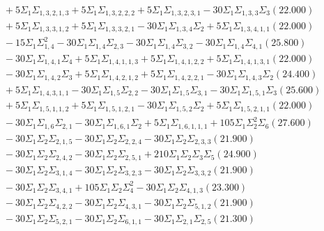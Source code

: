 \documentclass[12pt]{article}
\begin{document}
\begin{landscape}
\begin{align*}
		&\quad\quad +5\Sigma_{1}\Sigma_{1,3,2,1,3}+5\Sigma_{1}\Sigma_{1,3,2,2,2}+5\Sigma_{1}\Sigma_{1,3,2,3,1}-30\Sigma_{1}\Sigma_{1,3,3}\Sigma_{3}(22.000) \\ 
		&\quad\quad +5\Sigma_{1}\Sigma_{1,3,3,1,2}+5\Sigma_{1}\Sigma_{1,3,3,2,1}-30\Sigma_{1}\Sigma_{1,3,4}\Sigma_{2}+5\Sigma_{1}\Sigma_{1,3,4,1,1}(22.000) \\ 
		&\quad\quad -15\Sigma_{1}\Sigma_{1,4}^{2}-30\Sigma_{1}\Sigma_{1,4}\Sigma_{2,3}-30\Sigma_{1}\Sigma_{1,4}\Sigma_{3,2}-30\Sigma_{1}\Sigma_{1,4}\Sigma_{4,1}(25.800) \\ 
		&\quad\quad -30\Sigma_{1}\Sigma_{1,4,1}\Sigma_{4}+5\Sigma_{1}\Sigma_{1,4,1,1,3}+5\Sigma_{1}\Sigma_{1,4,1,2,2}+5\Sigma_{1}\Sigma_{1,4,1,3,1}(22.000) \\ 
		&\quad\quad -30\Sigma_{1}\Sigma_{1,4,2}\Sigma_{3}+5\Sigma_{1}\Sigma_{1,4,2,1,2}+5\Sigma_{1}\Sigma_{1,4,2,2,1}-30\Sigma_{1}\Sigma_{1,4,3}\Sigma_{2}(24.400) \\ 
		&\quad\quad +5\Sigma_{1}\Sigma_{1,4,3,1,1}-30\Sigma_{1}\Sigma_{1,5}\Sigma_{2,2}-30\Sigma_{1}\Sigma_{1,5}\Sigma_{3,1}-30\Sigma_{1}\Sigma_{1,5,1}\Sigma_{3}(25.600) \\ 
		&\quad\quad +5\Sigma_{1}\Sigma_{1,5,1,1,2}+5\Sigma_{1}\Sigma_{1,5,1,2,1}-30\Sigma_{1}\Sigma_{1,5,2}\Sigma_{2}+5\Sigma_{1}\Sigma_{1,5,2,1,1}(22.000) \\ 
		&\quad\quad -30\Sigma_{1}\Sigma_{1,6}\Sigma_{2,1}-30\Sigma_{1}\Sigma_{1,6,1}\Sigma_{2}+5\Sigma_{1}\Sigma_{1,6,1,1,1}+105\Sigma_{1}\Sigma_{2}^{2}\Sigma_{6}(27.600) \\ 
		&\quad\quad -30\Sigma_{1}\Sigma_{2}\Sigma_{2,1,5}-30\Sigma_{1}\Sigma_{2}\Sigma_{2,2,4}-30\Sigma_{1}\Sigma_{2}\Sigma_{2,3,3}(21.900) \\ 
		&\quad\quad -30\Sigma_{1}\Sigma_{2}\Sigma_{2,4,2}-30\Sigma_{1}\Sigma_{2}\Sigma_{2,5,1}+210\Sigma_{1}\Sigma_{2}\Sigma_{3}\Sigma_{5}(24.900) \\ 
		&\quad\quad -30\Sigma_{1}\Sigma_{2}\Sigma_{3,1,4}-30\Sigma_{1}\Sigma_{2}\Sigma_{3,2,3}-30\Sigma_{1}\Sigma_{2}\Sigma_{3,3,2}(21.900) \\ 
		&\quad\quad -30\Sigma_{1}\Sigma_{2}\Sigma_{3,4,1}+105\Sigma_{1}\Sigma_{2}\Sigma_{4}^{2}-30\Sigma_{1}\Sigma_{2}\Sigma_{4,1,3}(23.300) \\ 
		&\quad\quad -30\Sigma_{1}\Sigma_{2}\Sigma_{4,2,2}-30\Sigma_{1}\Sigma_{2}\Sigma_{4,3,1}-30\Sigma_{1}\Sigma_{2}\Sigma_{5,1,2}(21.900) \\ 
		&\quad\quad -30\Sigma_{1}\Sigma_{2}\Sigma_{5,2,1}-30\Sigma_{1}\Sigma_{2}\Sigma_{6,1,1}-30\Sigma_{1}\Sigma_{2,1}\Sigma_{2,5}(21.300) \\ 

\end{align*}
\end{landscape}
\end{document}
